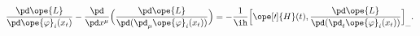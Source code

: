 \begin{equation}	\label{12.68}
\frac{\pd\ope{L}}{\pd \ope{\varphi}_i(x_t)}
-
\frac{\pd}{\pd x^\mu}\Bigl(
		\frac{\pd\ope{L}}{\pd(\pd_\mu\ope{\varphi}_i(x_t) )}
		 \Bigr)
=
- \frac{1}{\ih}
\Bigl[
\ope[\prime]{H}(t) ,
\frac{\pd\ope{L}}{\pd(\pd_t\ope{\varphi}_i(x_t) )}
\Bigr]_{\_} .
	\end{equation}

